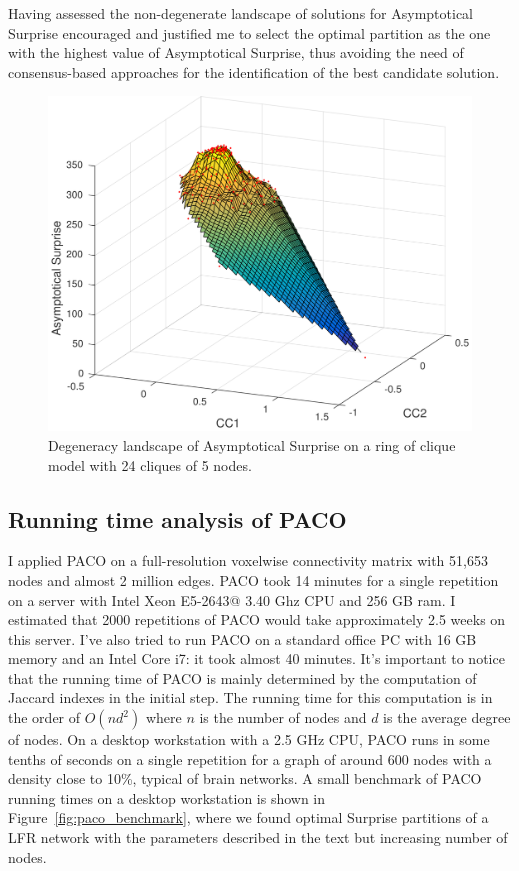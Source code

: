 Having assessed the non-degenerate landscape of solutions for Asymptotical Surprise encouraged and justified me to select the optimal partition as the one with the highest value of Asymptotical Surprise, thus avoiding the need of consensus-based approaches for the identification of the best candidate solution.
\begin{figure}[htb!]
\centering
\includegraphics[width=1.0\textwidth]{images/filtered_asymp_surp_ring_cliques_5_24_200.png}
\caption{Degeneracy landscape of Asymptotical Surprise on a ring of clique model with 24 cliques of 5 nodes.}
\label{fig:degeneracy_asymptotical_surprise}
\end{figure}

\subsection{Running time analysis of PACO}
I applied PACO on a full-resolution voxelwise connectivity matrix with 51,653 nodes and almost 2 million edges.
PACO took 14 minutes for a single repetition on a server with Intel Xeon E5-2643@ 3.40 Ghz CPU and 256 GB ram.
I estimated that 2000 repetitions of PACO would take approximately 2.5 weeks on this server.
I've also tried to run PACO on a standard office PC with 16 GB memory and an Intel Core i7: it took almost 40 minutes.
It's important to notice that the running time of PACO is mainly determined by the computation of Jaccard indexes in the initial step.
The running time for this computation is in the order of $O(nd^2)$ where $n$ is the number of nodes and $d$ is the average degree of nodes.
On a desktop workstation with a 2.5 GHz CPU, PACO runs in some tenths of seconds on a single repetition for a graph of around 600 nodes with a density close to 10\%, typical of brain networks.
A small benchmark of PACO running times on a desktop workstation is shown in Figure~\ref{fig:paco_benchmark}, where we found optimal Surprise partitions of a LFR network with the parameters described in the text but increasing number of nodes.

